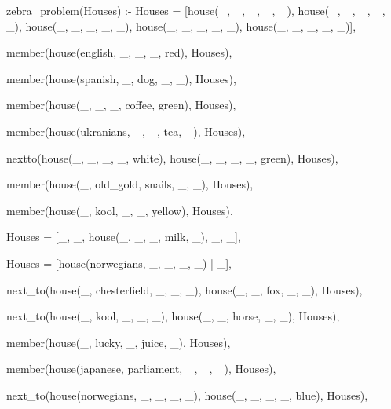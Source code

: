 \begin{minipage}{\linewidth}
\begin{python}
zebra_problem(Houses) :-
    Houses = [house(_, _, _, _, _), house(_, _, _, _, _), house(_, _, _, _, _), 
              house(_, _, _, _, _), house(_, _, _, _, _)], 

    member(house(english, _, _, _, red), Houses), 

    member(house(spanish, _, dog, _, _), Houses), 

    member(house(_, _, _, coffee, green), Houses), 

    member(house(ukranians, _, _, tea, _), Houses), 

    nextto(house(_, _, _, _, white), house(_, _, _, _, green), Houses), 

    member(house(_, old_gold, snails, _, _), Houses), 

    member(house(_, kool, _, _, yellow), Houses), 

    Houses = [_, _, house(_, _, _, milk, _), _, _], 

    Houses = [house(norwegians, _, _, _, _) | _], 

    next_to(house(_, chesterfield, _, _, _), house(_, _, fox, _, _), Houses), 

    next_to(house(_, kool, _, _, _), house(_, _, horse, _, _), Houses), 

    member(house(_, lucky, _, juice, _), Houses), 

    member(house(japanese, parliament, _, _, _), Houses), 

    next_to(house(norwegians, _, _, _, _), house(_, _, _, _, blue), Houses), 
\end{python}
\end{minipage}

